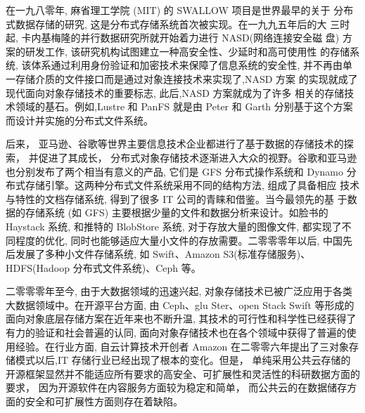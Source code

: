 
在一九八零年, 麻省理工学院 (MIT) 的 SWALLOW 项目是世界最早的关于
分布式数据存储的研究, 这是分布式存储系统首次被实现。在一九九五年后的大
三时起, 卡内基梅隆的并行数据研究所就开始着力进行 NASD(网络连接安全磁
盘) 方案的研发工作, 该研究机构试图建立一种高安全性、少延时和高可使用性
的存储系统, 该体系通过利用身份验证和加密技术来保障了信息系统的安全性,
并不再由单一存储介质的文件接口而是通过对象连接技术来实现了,NASD 方案
的实现就成了现代面向对象存储技术的重要标志, 此后,NASD 方案就成为了许多
相关的存储技术领域的基石。例如,Lustre 和 PanFS 就是由 Peter 和 Garth 分别基于这个方案而设计并实施的分布式文件系统。

后来， 亚马逊、谷歌等世界主要信息技术企业都进行了基于数据的存储技术的探索， 并促进了其成长， 分布式对象存储技术逐渐进入大众的视野。谷歌和亚马逊也分别发布了两个相当有意义的产品, 它们是 GFS 分布式操作系统和 Dynamo
分布式存储引擎。这两种分布式文件系统采用不同的结构方法, 组成了具备相应
技术与特性的文档存储系统, 得到了很多 IT 公司的青睐和借鉴。当今最领先的基
于数据的存储系统 (如 GFS) 主要根据少量的文件和数据分析来设计。如脸书的
Haystack 系统, 和推特的 BlobStore 系统, 对于存放大量的图像文件, 都实现了不同程度的优化, 同时也能够适应大量小文件的存放需要。二零零零年以后, 中国先后发展了多种小文件存储系统, 如 Swift、Amazon S3(标准存储服务)、HDFS(Hadoop 分布式文件系统)、Ceph 等。

二零零零年至今, 由于大数据领域的迅速兴起, 对象存储技术已被广泛应用于各类大数据领域中。在开源平台方面, 由 Ceph、glu Ster、open Stack Swift 等形成的面向对象底层存储方案在近年来也不断升温, 其技术的可行性和科学性已经获得了有力的验证和社会普遍的认同, 面向对象存储技术也在各个领域中获得了普遍的使用经验。在行业方面, 自云计算技术开创者 Amazon 在二零零六年提出了三对象存储模式以后,IT 存储行业已经出现了根本的变化。但是， 单纯采用公共云存储的开源框架显然并不能适应所有要求的高安全、可扩展性和灵活性的科研数据方面的要求， 因为开源软件在内容服务方面较为稳定和简单， 而公共云的在数据储存方面的安全和可扩展性方面则存在着缺陷。

